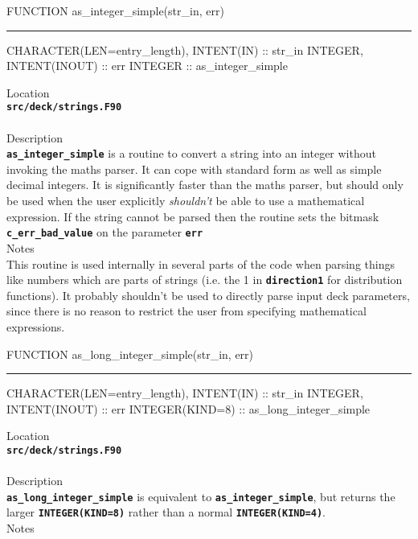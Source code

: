 \documentclass[12pt,a4paper]{article}
\newcommand{\HRule}{\rule[0.3cm]{\linewidth}{0.5mm}}
\newcommand{\inlinecode}[1]{{\color{warwickred} \bf\texttt{#1}}}
\begin{document}
\pagebreak
\begin{codedef}
FUNCTION as_integer_simple(str_in, err)
\HRule
CHARACTER(LEN=entry_length), INTENT(IN) :: str_in
INTEGER, INTENT(INOUT) :: err
INTEGER :: as_integer_simple
\end{codedef}
\vspace{1cm}
{\Large Location\\}
\inlinecode{src/deck/strings.F90}\\
\\[0.5cm]
{\Large Description\\}
\inlinecode{as\_integer\_simple} is a routine to convert a string into an
integer without invoking the maths parser. It can cope with standard form as
well as simple decimal integers. It is significantly faster than the maths
parser, but should only be used when the user explicitly {\it shouldn't} be
able to use a mathematical expression. If the string cannot be parsed then the
routine sets the bitmask \inlinecode{c\_err\_bad\_value} on the parameter
\inlinecode{err}
\\[0.5cm]
{\Large Notes\\}
This routine is used internally in several parts of the code when parsing
things like numbers which are parts of strings (i.e. the 1 in
\inlinecode{direction1} for distribution functions). It probably shouldn't
be used to directly parse input deck parameters, since there is no reason to
restrict the user from specifying mathematical expressions.

\pagebreak
\begin{codedef}
FUNCTION as_long_integer_simple(str_in, err)
\HRule
CHARACTER(LEN=entry_length), INTENT(IN) :: str_in
INTEGER, INTENT(INOUT) :: err
INTEGER(KIND=8) :: as_long_integer_simple
\end{codedef}
\vspace{1cm}
{\Large Location\\}
\inlinecode{src/deck/strings.F90}\\
\\[0.5cm]
{\Large Description\\}
\inlinecode{as\_long\_integer\_simple} is equivalent to
\inlinecode{as\_integer\_simple}, but returns the larger
\inlinecode{INTEGER(KIND=8)} rather than a normal \inlinecode{INTEGER(KIND=4)}.
\\[0.5cm]
{\Large Notes\\}
\end{document}
